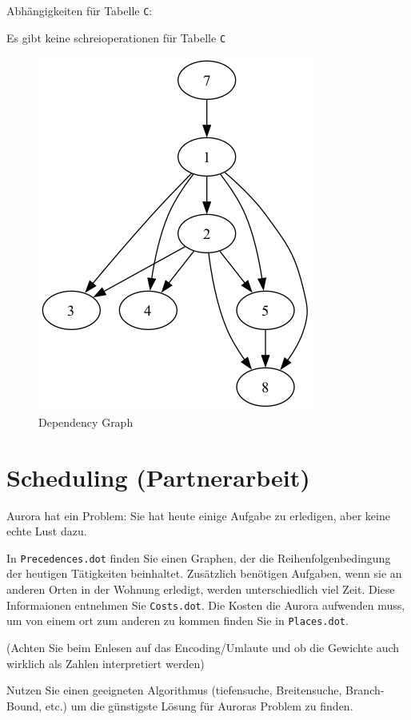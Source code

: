 \documentclass[a4paper,11pt]{report}
\begin{document}
Abhängigkeiten für Tabelle \texttt{C}:

Es gibt keine schreioperationen für Tabelle \texttt{C}

\begin{figure}[htbp]
    \centering
    \includegraphics[height=0.2\textheight]{images/dependency_graph}
    \caption{Dependency Graph}
    \label{fig:a02_dependency_graph}
\end{figure}

\newpage

\chapter{Scheduling (Partnerarbeit)}

Aurora hat ein Problem: Sie hat heute einige Aufgabe zu erledigen, aber keine echte Lust dazu.

In \texttt{Precedences.dot} finden Sie einen Graphen, der die Reihenfolgenbedingung der heutigen Tätigkeiten beinhaltet.
Zusätzlich benötigen Aufgaben, wenn sie an anderen Orten in der Wohnung erledigt, werden unterschiedlich viel Zeit.
Diese Informaionen entnehmen Sie \texttt{Costs.dot}.
Die Kosten die Aurora aufwenden muss, um von einem ort zum anderen zu kommen finden Sie in \texttt{Places.dot}.

(Achten Sie beim Enlesen auf das Encoding/Umlaute und ob die Gewichte auch wirklich als Zahlen interpretiert werden)

Nutzen Sie einen geeigneten Algorithmus (tiefensuche, Breitensuche, Branch-Bound, etc.) um die günstigste Lösung für Auroras Problem zu finden.
\end{document}
